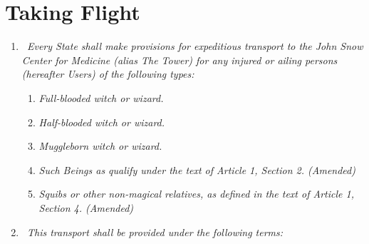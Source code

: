 \hypertarget{taking-flight}{%
\chapter{Taking Flight}\label{taking-flight}}

\begin{enumerate}
\def\labelenumi{\arabic{enumi}.}
\tightlist
\item
  \texttt{~}\emph{Every State shall make provisions for expeditious
  transport to the John Snow Center for Medicine (alias The Tower) for
  any injured or ailing persons (hereafter Users) of the following
  types:}

  \begin{enumerate}
  \def\labelenumii{\arabic{enumii}.}
  \tightlist
  \item
    \emph{Full-blooded witch or wizard.}
  \item
    \emph{Half-blooded witch or wizard.}
  \item
    \emph{Muggleborn witch or wizard.}
  \item
    \emph{Such Beings as qualify under the text of Article 1, Section 2.
    (Amended)}
  \item
    \emph{Squibs or other non-magical relatives, as defined in the text
    of Article 1, Section 4. (Amended)}
  \end{enumerate}
\item
  \texttt{~}\emph{This transport shall be provided under the following
  terms:}


\end{enumerate}
